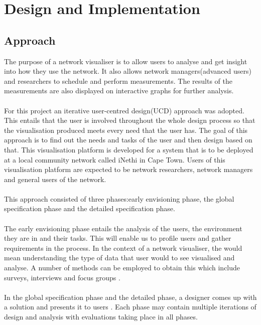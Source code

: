 \section{Design and Implementation}
\subsection{Approach}
The purpose of a network visualiser is to allow users to analyse and get insight into how they use the network\cite{Ruan2018}. It also allows network managers(advanced users) and researchers to schedule and perform measurements. The results of the measurements are also displayed on interactive graphs for further analysis.
\paragraph{}
For this project an iterative user-centred design(UCD) approach was adopted. This entails that the user is involved throughout the whole design process so that the visualisation produced meets every need that the user has\cite{Andrews:2006:EIV:1168149.1168151}. The goal of this approach is to find out the needs and tasks of the user and then design based on that\cite{Dylggduu}. This visualisation platform is developed for a system that is to be deployed at a local community network called iNethi in Cape Town. Users of this visualisation platform are expected to be network researchers, network managers and general users of the network.
\paragraph{}
This approach consisted of three phases:early envisioning phase, the global specification phase and the detailed specification phase\cite{Kulykinbook}.
\paragraph{}
The early envisioning phase entails the analysis of the users, the environment they are in and their tasks. This will enable us to profile users and gather requirements in the process\cite{Kulykinbook}. In the context of a network visualiser, the would mean understanding the type of data that user would to see visualised and analyse. A number of methods can be employed to obtain this which include surveys, interviews and focus groups\cite{Kulykinbook} \cite{Abras04user-centereddesign}.
\paragraph{}
In the global specification phase and the detailed phase, a designer comes up with a solution and presents it to users\cite{Abras04user-centereddesign} \cite{Kulykinbook}. Each phase may contain multiple iterations of design and analysis with evaluations taking place in all phases\cite{Abras04user-centereddesign}.
